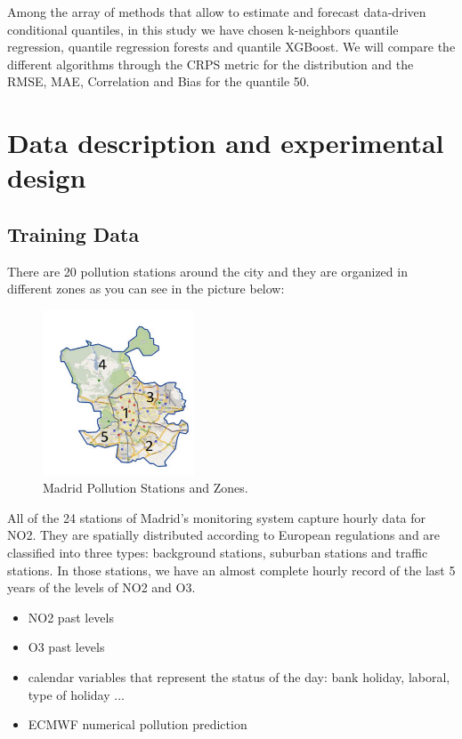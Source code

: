 \documentclass[a4paper,twocolumn,5p]{elsarticle}
\begin{document}
Among the array of methods that allow to estimate and forecast
data-driven conditional quantiles, in this study we have chosen
k-neighbors quantile regression, quantile regression forests and quantile XGBoost. 
We will compare the different algorithms through the CRPS metric for the 
distribution and the RMSE, MAE, Correlation and Bias for the quantile 50.

\section{Data description and experimental design}

\subsection{Training Data}

There are 20 pollution stations around the city and they are organized in different
zones as you can see in the picture below:

\begin{figure}
  \caption{Madrid Pollution Stations and Zones.}
  \centering
      \includegraphics[width=0.4\textwidth]{zonas_madrid}
\end{figure}

All of the 24 stations of Madrid’s monitoring system capture hourly data for NO2. 
They are spatially distributed according to European regulations and are classified into three types: 
background stations, suburban stations and traffic stations. In those stations, we have an almost complete 
hourly record of the last 5 years of the levels of NO2 and O3.


\begin{itemize}
  \item NO2 past levels
  \item O3 past levels
  \item calendar variables that represent the status of the day: bank holiday, laboral, type of holiday ...
  \item ECMWF numerical pollution prediction
\end{itemize} 
\end{document}
